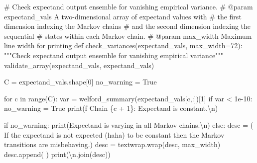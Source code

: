 \documentclass[
  letterpaper,
  DIV=11,
  numbers=noendperiod]{scrartcl}
\newenvironment{Shaded}{\begin{snugshade}}{\end{snugshade}}
\newcommand{\BuiltInTok}[1]{\textcolor[rgb]{0.00,0.23,0.31}{#1}}
\newcommand{\CharTok}[1]{\textcolor[rgb]{0.13,0.47,0.30}{#1}}
\newcommand{\CommentTok}[1]{\textcolor[rgb]{0.37,0.37,0.37}{#1}}
\newcommand{\ControlFlowTok}[1]{\textcolor[rgb]{0.00,0.23,0.31}{#1}}
\newcommand{\DecValTok}[1]{\textcolor[rgb]{0.68,0.00,0.00}{#1}}
\newcommand{\FloatTok}[1]{\textcolor[rgb]{0.68,0.00,0.00}{#1}}
\newcommand{\KeywordTok}[1]{\textcolor[rgb]{0.00,0.23,0.31}{#1}}
\newcommand{\NormalTok}[1]{\textcolor[rgb]{0.00,0.23,0.31}{#1}}
\newcommand{\OperatorTok}[1]{\textcolor[rgb]{0.37,0.37,0.37}{#1}}
\newcommand{\SpecialCharTok}[1]{\textcolor[rgb]{0.37,0.37,0.37}{#1}}
\newcommand{\SpecialStringTok}[1]{\textcolor[rgb]{0.13,0.47,0.30}{#1}}
\newcommand{\StringTok}[1]{\textcolor[rgb]{0.13,0.47,0.30}{#1}}
\newcommand{\VariableTok}[1]{\textcolor[rgb]{0.07,0.07,0.07}{#1}}
\begin{document}
\begin{Shaded}
\begin{Highlighting}[]
\CommentTok{\# Check expectand output ensemble for vanishing empirical variance.}
\CommentTok{\# @param expectand\_vals A two{-}dimensional array of expectand values with}
\CommentTok{\#                       the first dimension indexing the Markov chains}
\CommentTok{\#                       and the second dimension indexing the sequential}
\CommentTok{\#                       states within each Markov chain.}
\CommentTok{\# @param max\_width Maximum line width for printing}
\KeywordTok{def}\NormalTok{ check\_variances(expectand\_vals, max\_width}\OperatorTok{=}\DecValTok{72}\NormalTok{):}
  \CommentTok{"""Check expectand output ensemble for vanishing empirical variance"""}
\NormalTok{  validate\_array(expectand\_vals, }\StringTok{\textquotesingle{}expectand\_vals\textquotesingle{}}\NormalTok{)}

\NormalTok{  C }\OperatorTok{=}\NormalTok{ expectand\_vals.shape[}\DecValTok{0}\NormalTok{]}
\NormalTok{  no\_warning }\OperatorTok{=} \VariableTok{True}

  \ControlFlowTok{for}\NormalTok{ c }\KeywordTok{in} \BuiltInTok{range}\NormalTok{(C):}
\NormalTok{    var }\OperatorTok{=}\NormalTok{ welford\_summary(expectand\_vals[c,:])[}\DecValTok{1}\NormalTok{]}
    \ControlFlowTok{if}\NormalTok{ var }\OperatorTok{\textless{}} \FloatTok{1e{-}10}\NormalTok{:}
\NormalTok{      no\_warning }\OperatorTok{=} \VariableTok{True}
      \BuiltInTok{print}\NormalTok{(}\SpecialStringTok{f\textquotesingle{}  Chain }\SpecialCharTok{\{}\NormalTok{c }\OperatorTok{+} \DecValTok{1}\SpecialCharTok{\}}\SpecialStringTok{: Expectand is constant.}\CharTok{\textbackslash{}n}\SpecialStringTok{\textquotesingle{}}\NormalTok{)}

  \ControlFlowTok{if}\NormalTok{ no\_warning:}
    \BuiltInTok{print}\NormalTok{(}\StringTok{\textquotesingle{}Expectand is varying in all Markov chains.}\CharTok{\textbackslash{}n}\StringTok{\textquotesingle{}}\NormalTok{)}
  \ControlFlowTok{else}\NormalTok{:}
\NormalTok{    desc }\OperatorTok{=}\NormalTok{ (}\StringTok{\textquotesingle{}  If the expectand is not expected (haha) to be \textquotesingle{}}
            \StringTok{\textquotesingle{}constant then the Markov transitions are misbehaving.\textquotesingle{}}\NormalTok{)}
\NormalTok{    desc }\OperatorTok{=}\NormalTok{ textwrap.wrap(desc, max\_width)}
\NormalTok{    desc.append(}\StringTok{\textquotesingle{} \textquotesingle{}}\NormalTok{)}
    \BuiltInTok{print}\NormalTok{(}\StringTok{\textquotesingle{}}\CharTok{\textbackslash{}n}\StringTok{\textquotesingle{}}\NormalTok{.join(desc))}
\end{Highlighting}
\end{Shaded}
\end{document}

